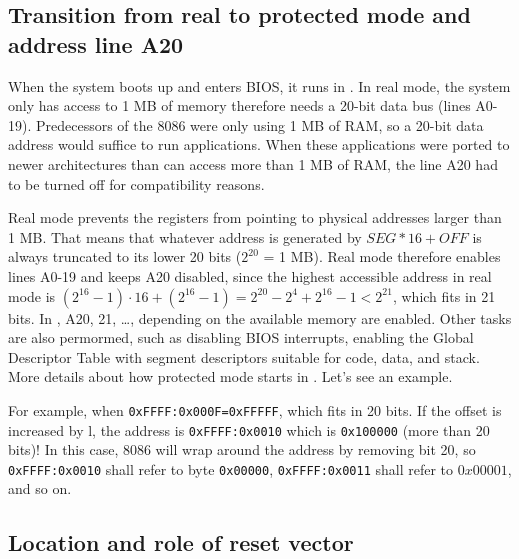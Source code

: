 \documentclass[a4paper]{article}
\begin{document}
\newpage
\subsection{Transition from real to protected mode and address line A20}
\label{app:modes}

When the system boots up and enters BIOS, it runs in . In real mode, the system only has access to 1 MB of memory therefore needs a 20-bit data bus (lines A0-19). Predecessors of the 8086 were only using 1 MB of RAM, so a 20-bit data address would suffice to run applications. When these applications were ported to newer architectures than can access more than 1 MB of RAM, the line A20 had to be turned off for compatibility reasons.

Real mode prevents the registers from pointing to physical addresses larger than 1 MB. That means that whatever address is generated by $SEG*16+OFF$ is always truncated to its lower 20 bits ($2^{20}$ = 1 MB). Real mode therefore enables lines A0-19 and keeps A20 disabled, since the highest accessible address in real mode is $(2^{16}-1)\cdot 16+(2^{16}-1) = 2^{20} - 2^4 + 2^{16} - 1 < 2^{21} $, which fits in 21 bits. In , A20, 21, \ldots, depending on the available memory are enabled. Other tasks are also permormed, such as disabling BIOS interrupts, enabling the Global Descriptor Table with segment descriptors suitable for code, data, and stack. More details about how protected mode starts in \TODO[ref]. Let's see an example.

For example, when \texttt{0xFFFF:0x000F=0xFFFFF}, which fits in 20 bits. If the offset is increased by l, the address is \texttt{0xFFFF:0x0010} which is \texttt{0x100000} (more than 20 bits)! In this case, 8086 will wrap around the address by removing bit 20, so \texttt{0xFFFF:0x0010} shall refer to byte \texttt{0x00000}, \texttt{0xFFFF:0x0011} shall refer to $0x00001$, and so on.


\newpage
\subsection{Location and role of reset vector}
\label{app:reset_vec}
\end{document}
